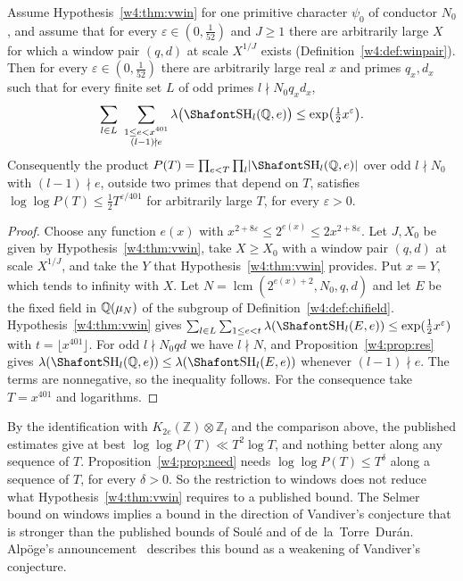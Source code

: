 \begin{proposition}\label{w4:prop:need}
Assume Hypothesis~\ref{w4:thm:vwin} for one primitive character $\psi_0$ of conductor $N_0$, and assume that for every $\varepsilon\in(0,\frac1{52})$ and $J\ge1$ there are arbitrarily large $X$ for which a window pair $(q,d)$ at scale $X^{1/J}$ exists (Definition~\ref{w4:def:winpair}). Then for every $\varepsilon\in(0,\frac1{52})$ there are arbitrarily large real $x$ and primes $q_x,d_x$ such that for every finite set $L$ of odd primes $l\nmid N_0q_xd_x$,
\[
\sum_{l\in L}\ \sum_{\substack{1\le e<x^{401}\\(l-1)\nmid e}}\lambda\bigl(\Sha_l(\Q,e)\bigr)\le\exp\bigl(\tfrac12x^{\varepsilon}\bigr).
\]
Consequently the product $P(T)=\prod_{e<T}\prod_{l}\lvert\Sha_l(\Q,e)\rvert$ over odd $l\nmid N_0$ with $(l-1)\nmid e$, outside two primes that depend on $T$, satisfies $\log\log P(T)\le\frac12T^{\varepsilon/401}$ for arbitrarily large $T$, for every $\varepsilon>0$.
\end{proposition}

\begin{proof}
Choose any function $e(x)$ with $x^{2+8\varepsilon}\le2^{e(x)}\le2x^{2+8\varepsilon}$. Let $J,X_0$ be given by Hypothesis~\ref{w4:thm:vwin}, take $X\ge X_0$ with a window pair $(q,d)$ at scale $X^{1/J}$, and take the $Y$ that Hypothesis~\ref{w4:thm:vwin} provides. Put $x=Y$, which tends to infinity with $X$. Let $N=\operatorname{lcm}(2^{e(x)+2},N_0,q,d)$ and let $E$ be the fixed field in $\mathbb Q(\mu_N)$ of the subgroup of Definition~\ref{w4:def:chifield}. Hypothesis~\ref{w4:thm:vwin} gives $\sum_{l\in L}\sum_{1\le e<t}\lambda(\Sha_l(E,e))\le\exp(\frac12x^\varepsilon)$ with $t=\lfloor x^{401}\rfloor$. For odd $l\nmid N_0qd$ we have $l\nmid N$, and Proposition~\ref{w4:prop:res} gives $\lambda(\Sha_l(\Q,e))\le\lambda(\Sha_l(E,e))$ whenever $(l-1)\nmid e$. The terms are nonnegative, so the inequality follows. For the consequence take $T=x^{401}$ and logarithms.
\end{proof}

By the identification with $K_{2e}(\mathbb Z)\otimes\mathbb Z_l$ and the comparison above, the published estimates give at best $\log\log P(T)\ll T^{2}\log T$, and nothing better along any sequence of $T$. Proposition~\ref{w4:prop:need} needs $\log\log P(T)\le T^{\delta}$ along a sequence of $T$, for every $\delta>0$. So the restriction to windows does not reduce what Hypothesis~\ref{w4:thm:vwin} requires to a published bound. The Selmer bound on windows implies a bound in the direction of Vandiver's conjecture that is stronger than the published bounds of Soul\'e and of de~la~Torre~Dur\'an. Alp\"oge's announcement~\cite{note} describes this bound as a weakening of Vandiver's conjecture.

